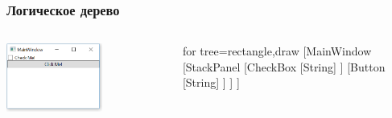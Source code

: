 \documentclass[xetex,mathserif,serif]{beamer}
\begin{document}
\begin{frame}[fragile]
\begin{columns}
\begin{column}{0.3\textwidth}
\begin{center}
				\end{center}
			\end{column}
		\end{columns}
	\end{frame}

	\begin{frame}
		\frametitle{Логическое дерево}
		\begin{columns}
			\begin{column}{0.5\textwidth}
				\begin{center}
					\includegraphics[width=0.6\textwidth]{wpfApp.png}
				\end{center}
			\end{column}
			\begin{column}{0.5\textwidth}
				\begin{center}
					\begin{tiny}
						\begin{forest}
							for tree={rectangle,draw}
							[MainWindow
								[StackPanel
									[CheckBox
										[String]
									]
									[Button
										[String]
									]
								]
							]
						\end{forest}
					\end{tiny}
				\end{center}
			\end{column}
		\end{columns}
	\end{frame}
\end{document}
